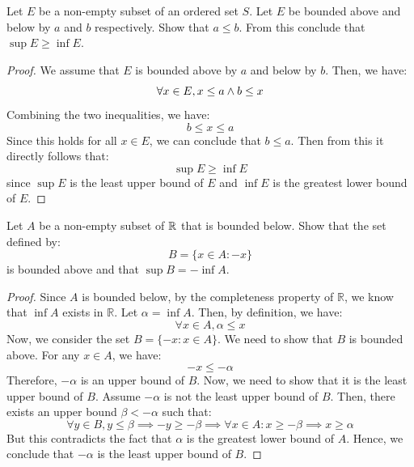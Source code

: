 \documentclass[openany]{book}
\begin{document}
\begin{exercise}
    Let $E$ be a non-empty subset of an ordered set $S$. Let $E$ be bounded above and below by $a$ and $b$ respectively. Show that $a \leq b$. From this conclude that $\sup E \geq \inf E$.
\end{exercise}
\begin{proof}
We assume that $E$ is bounded above by $a$ and below by $b$. Then, we have:
$$\forall x \in E, x \leq a \wedge b \leq x$$
Combining the two inequalities, we have:
$$b \leq x \leq a$$
Since this holds for all $x \in E$, we can conclude that $b \leq a$.
Then from this it directly follows that: 
$$\sup E \geq \inf E$$
since $\sup E$ is the least upper bound of $E$ and $\inf E$ is the greatest lower bound of $E$.
\end{proof}
\begin{exercise}
    Let $A$ be a non-empty subset of $\mathbb{R}$ that is bounded below. Show that the set defined by: 
    $$B = \{x \in A: -x\}$$ 
    is bounded above and that $\sup B = -\inf A$.
\end{exercise}
\begin{proof}
    Since $A$ is bounded below, by the completeness property of $\mathbb{R}$, we know that $\inf A$ exists in $\mathbb{R}$. Let $\alpha = \inf A$. Then, by definition, we have:
    $$\forall x \in A, \alpha \leq x$$
    Now, we consider the set $B = \{-x: x \in A\}$. We need to show that $B$ is bounded above. For any $x \in A$, we have:
    $$-x \leq -\alpha$$
    Therefore, $-\alpha$ is an upper bound of $B$. Now, we need to show that it is the least upper bound of $B$. Assume $-\alpha$ is not the least upper bound of $B$. Then, there exists an upper bound $\beta < -\alpha$ such that: 
    $$\forall y \in B, y \leq \beta \implies -y \geq -\beta \implies \forall x \in A: x \geq -\beta \implies x \geq \alpha$$
    But this contradicts the fact that $\alpha$ is the greatest lower bound of $A$. Hence, we conclude that $-\alpha$ is the least upper bound of $B$. 
\end{proof}
\end{document}

